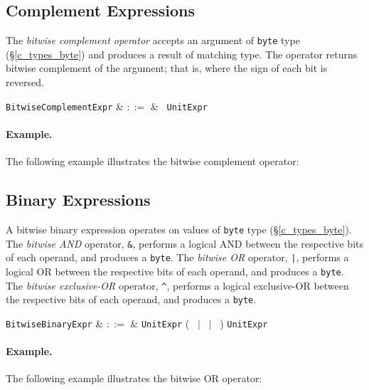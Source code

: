 \subsection{Complement Expressions}
\label{c_expr_bitwise_complement}
The {\em bitwise complement operator} accepts an argument of \lstinline{byte} type (\S\ref{c_types_byte}) and produces a result of matching type.  The operator returns bitwise complement of the argument; that is, where the sign of each bit is reversed.

\begin{syntax}
\verb+BitwiseComplementExpr+ & $::=$ & \token{$\sim$}\ \verb+UnitExpr+\\
\end{syntax}

\paragraph{Example.}  The following example illustrates the bitwise complement operator:



\subsection{Binary Expressions}
\label{c_expr_bitwise_binary}
A bitwise binary expression operates on values of \lstinline{byte} type (\S\ref{c_types_byte}).  The {\em bitwise AND} operator, \lstinline{&}, performs a logical AND between the respective bits of each operand, and produces a \lstinline{byte}.   The {\em bitwise OR} operator, \lstinline{|}, performs a logical OR between the respective bits of each operand, and produces a \lstinline{byte}.  The {\em bitwise exclusive-OR} operator, \lstinline{^}, performs a logical exclusive-OR between the respective bits of each operand, and produces a \lstinline{byte}.

\begin{syntax}
  \verb+BitwiseBinaryExpr+ & $::=$ & \verb+UnitExpr+ \big(\ \token{\&} $|$ \token{|}\ $|$ \token{\^}\ \big) \verb+UnitExpr+\\
\end{syntax}

\paragraph{Example.}  The following example illustrates the bitwise OR operator:



